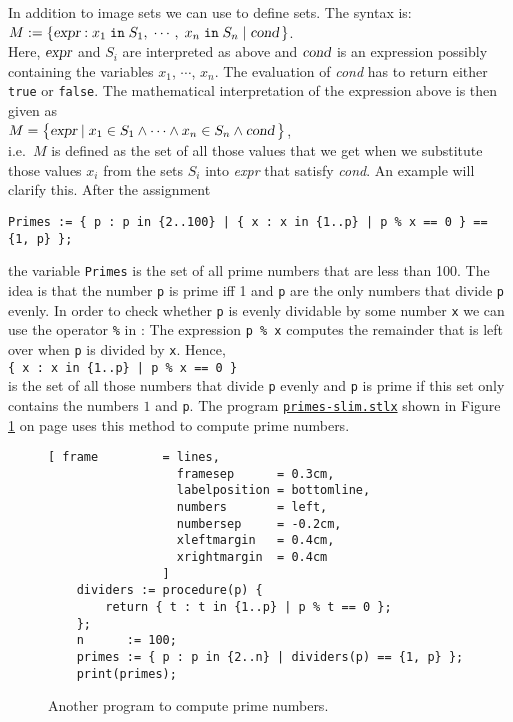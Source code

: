 In addition to image sets we can use  to define sets.
The syntax is: 
\\[0.2cm]
\hspace*{1.3cm}  
$M := \{ \textsl{expr} : x_1 \;\mathtt{in}\; S_1,\; \cdots,\; x_n \;\mathtt{in}\; S_n \mid \textsl{cond}\, \}$. 
\\[0.2cm]
Here,   $\textsl{expr}$ and $S_i$ are interpreted as above and  
 $\textsl{cond}$ is an expression possibly containing the variables  $x_1$, $\cdots$, $x_n$.  The
 evaluation of \textsl{cond} has to return either  \texttt{true} or \texttt{false}.  The
 mathematical interpretation of the expression above is then given as \\[0.2cm]
\hspace*{1.3cm} 
$M = \bigl\{ \textsl{expr} \mid x_1 \in S_1 \wedge \cdots \wedge x_n \in S_n \wedge \textsl{cond}
\,\bigr\}$, 
\\[0.2cm]
i.e.~$M$ is defined as the set of all those values that we get when we substitute those values $x_i$
from the sets $S_i$ into \textsl{expr} that satisfy \textsl{cond}.  An example will clarify this.
After the assignment
\begin{alltt}
  \texttt{Primes := \{ p : p in  \{2..100\} | \{ x : x in \{1..p\} | p \% x == 0 \} == \{1, p\} \};}
\end{alltt}
the variable \texttt{Primes} is the set of all prime numbers that are less than 100.
The idea is that the number \texttt{p} is prime iff 1 and \texttt{p} are the only numbers that divide
\texttt{p} evenly.  In order to check whether \texttt{p} is evenly dividable by some number
\texttt{x} we can use the operator \texttt{\%}
in \setl: The expression \texttt{p \% x}
computes the remainder that is left over when \texttt{p} is divided by \texttt{x}.
Hence,
\\[0.2cm]
\hspace*{1.3cm} 
\texttt{\{ x : x in \{1..p\} | p \% x == 0 \}}
\\[0.2cm]
is the set of all those numbers that divide \texttt{p} evenly and \texttt{p} is prime if this set
only contains the numbers  $1$ and \texttt{p}.  The program
\href{https://github.com/karlstroetmann/Logik/blob/master/SetlX/primes-slim.stlx}{\texttt{primes-slim.stlx}}
shown in Figure
\ref{fig:primes-slim.stlx} on page \pageref{fig:primes-slim.stlx} uses this method to compute prime numbers.


\begin{figure}[!ht]
  \centering
\begin{Verbatim}[ frame         = lines, 
                  framesep      = 0.3cm, 
                  labelposition = bottomline,
                  numbers       = left,
                  numbersep     = -0.2cm,
                  xleftmargin   = 0.4cm,
                  xrightmargin  = 0.4cm
                ]
    dividers := procedure(p) {
        return { t : t in {1..p} | p % t == 0 };
    };
    n      := 100;
    primes := { p : p in {2..n} | dividers(p) == {1, p} };
    print(primes);
\end{Verbatim} 
\vspace*{-0.3cm}
\caption{Another program to compute prime numbers.  \label{fig:primes-slim.stlx}}
\end{figure} 

